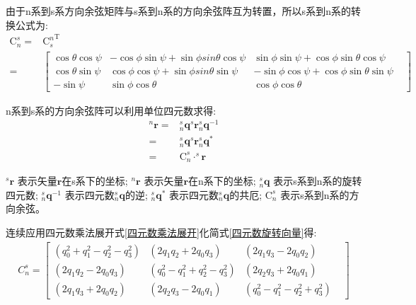 \documentclass[12pt,a4paper]{article}
\renewcommand{\citep}[1]{\textsuperscript{\cite{#1}}}
\begin{document}
由于n系到s系方向余弦矩阵与s系到n系的方向余弦阵互为转置\citep{方向余弦阵}，所以s系到n系的转换公式为:
\begin{equation}\label{欧拉角s转n}
    \begin{split} 
        \mathrm{C}^s_n=&{\mathrm{C}^n_s}^\mathrm{T} \\
             =&\left[\begin{matrix}
                \cos{\theta}\cos{\psi} & -\cos{\phi}\sin{\psi}+\sin{\phi}sin{\theta}\cos{\psi} &  \sin{\phi}\sin{\psi} + \cos{\phi}\sin{\theta}\cos{\psi} & \\
                \cos{\theta}\sin{\psi} &  \cos{\phi}\cos{\psi}+\sin{\phi}sin{\theta}\sin{\psi} & -\sin{\phi}\cos{\psi} + \cos{\phi}\sin{\theta}\sin{\psi} & \\
                -\sin{\psi} & \sin{\phi}\cos{\theta} & \cos{\phi}\cos{\theta} &
                \end{matrix}\right]
    \end{split}
\end{equation} 

n系到s系的方向余弦阵可以利用单位四元数\citep{四元数矢量旋转证明1,四元数矢量旋转证明2}求得:
\begin{equation}\label{四元数旋转向量}
    \begin{split} 
        ^n\bm{r} 
        = &^s_n\bm{q} ^s\bm{r} ^s_n\bm{q}^{-1} \\
        = &^s_n\bm{q} ^s\bm{r} ^s_n\bm{q}^{*} \\
        = &\mathrm{C}^s_n \cdot ^s\bm{r}
    \end{split}
\end{equation} 

$^s\bm{r}$          表示矢量$\bm{r}$在s系下的坐标;
$^n\bm{r}$          表示矢量$\bm{r}$在n系下的坐标;
$^s_n\bm{q}$        表示s系到n系的旋转四元数;
$^s_n\bm{q}^{-1}$   表示四元数$^s_n\bm{q}$的逆\citep{四元数矢量旋转证明1,四元数矢量旋转证明2};
$^s_n\bm{q}^{*}$    表示四元数$^s_n\bm{q}$的共厄\citep{四元数矢量旋转证明1,四元数矢量旋转证明2};
$\mathrm{C}^s_n$    表示s系到n系的方向余弦。

连续应用四元数乘法展开式\ref{四元数乘法展开}化简式\ref{四元数旋转向量}得:
\begin{equation}\label{四元数方向余弦阵}
    \begin{split} 
        C^s_n = \left[\begin{matrix} 
                (q^2_0+q^2_1-q^2_2-q^2_3) & (2q_1q_2+2q_0q_3) & (2q_1q_3-2q_0q_2) & \\
                (2q_1q_2-2q_0q_3) & (q^2_0-q^2_1+q^2_2-q^2_3) & (2q_2q_3+2q_0q_1) & \\
                (2q_1q_3+2q_0q_2) & (2q_2q_3-2q_0q_1) & (q^2_0-q^2_1-q^2_2+q^2_3) &
        \end{matrix}\right]
    \end{split}
\end{equation} 
\end{document}

